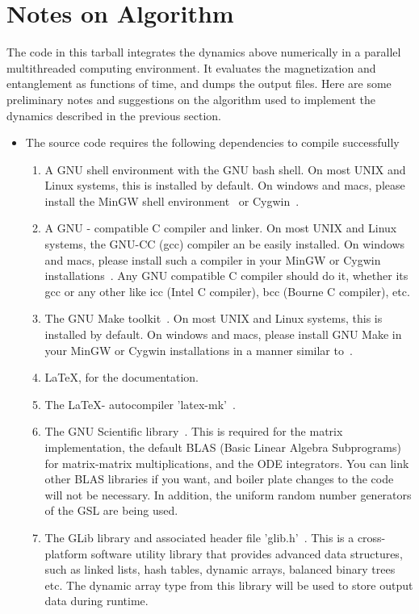 \documentclass[a4paper,10pt]{article}
\begin{document}
\section{\sc Notes on Algorithm}
The code in this tarball integrates the dynamics above numerically in a parallel multithreaded computing environment. It evaluates the magnetization and entanglement as functions of time, and dumps the output files. Here are some preliminary notes and suggestions on the algorithm used to implement the dynamics described in the previous section.
\begin{itemize}
 \item
 The source code requires the following dependencies to compile successfully
 \begin{enumerate}
  \item 
  A GNU shell environment with the GNU bash shell. On most UNIX and Linux systems, this is installed by default. On windows and macs, please install the MinGW shell environment~\cite{mingw} or Cygwin~\cite{cygwin}.
  \item
  A GNU - compatible C compiler and linker. On most UNIX and Linux systems, the GNU-CC (gcc) compiler an be easily installed. On windows and macs, please install such a compiler in your MinGW or Cygwin installations~\cite{gccmingw,gcccygwin}. Any GNU compatible C compiler should do it, whether its gcc or any other like icc (Intel C compiler), bcc (Bourne C compiler), etc.
  \item
  The GNU Make toolkit~\cite{make}. On most UNIX and Linux systems, this is installed by default. On windows and macs, please install GNU Make in your MinGW or Cygwin installations in a manner similar to~\cite{gccmingw,gcccygwin}.
  \item
  \LaTeX , for the documentation.
  \item
  The \LaTeX - autocompiler 'latex-mk'~\cite{latexmk}.
  \item
  The GNU Scientific library~\cite{galassi:gsl}. This is required for the matrix implementation, the default BLAS (Basic Linear Algebra Subprograms)~\cite{blas} for matrix-matrix multiplications, and the ODE integrators. You can link other BLAS libraries if you want, and boiler plate changes to the code will not be necessary. In addition, the uniform random number generators of the GSL are being used.
  \item
  The GLib library and associated header file 'glib.h'~\cite{glib}. This is a cross-platform software utility library that  provides advanced data structures, such as linked lists, hash tables, dynamic arrays, balanced binary trees etc. The dynamic array type from this library will be used to store output data during runtime.

\end{enumerate}
\end{itemize}
\end{document}
